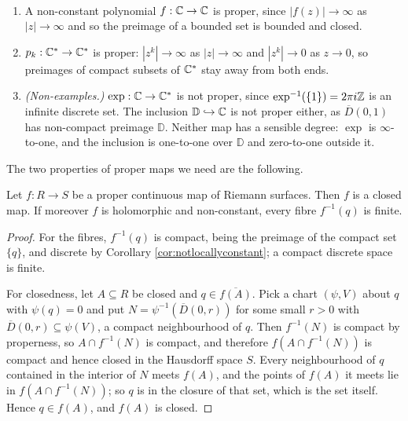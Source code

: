 \documentclass[a4paper]{scrartcl}
\newcommand{\disc}{\mathbb{D}}
\newcommand{\Cs}{\C^*}
\begin{document}
\begin{example}\
	\begin{enumerate}[label=(\roman*)]
		\item A non-constant polynomial $f : \mathbb{C} \to \mathbb{C}$ is proper, since $|f(z)|\to\infty$
		as $|z|\to\infty$ and so the preimage of a bounded set is bounded and closed.
		\item $p_k : \Cs \to \Cs$ is proper: $|z^k| \to \infty$ as $|z| \to \infty$ and
		$|z^k|\to 0$ as $z \to 0$, so preimages of compact subsets of $\Cs$ stay away from
		both ends.
		\item \emph{(Non-examples.)} $\exp : \C \to \Cs$ is not proper, since
		$\exp^{-1}(\{1\}) = 2\pi i \mathbb{Z}$ is an infinite discrete set. The inclusion
		$\disc \hookrightarrow \C$ is not proper either, as $\overline{D}(0,1)$ has
		non-compact preimage $\disc$. Neither map has a sensible degree: $\exp$ is
		$\infty$-to-one, and the inclusion is one-to-one over $\disc$ and zero-to-one
		outside it.
	\end{enumerate}
\end{example}

The two properties of proper maps we need are the following.

\begin{lemma}\label{lem:properclosed}
	Let $f : R \to S$ be a proper continuous map of Riemann surfaces. Then $f$ is a closed
	map. If moreover $f$ is holomorphic and non-constant, every fibre $f^{-1}(q)$ is finite.
\end{lemma}

\begin{proof}
	For the fibres, $f^{-1}(q)$ is compact, being the preimage of the compact set $\{q\}$,
	and discrete by Corollary \ref{cor:notlocallyconstant}; a compact discrete space is
	finite.

	For closedness, let $A \subseteq R$ be closed and $q \in \overline{f(A)}$. Pick a chart
	$(\psi, V)$ about $q$ with $\psi(q) = 0$ and put
	$N = \psi^{-1}(\overline{D}(0,r))$ for some small $r > 0$ with
	$\overline{D}(0,r)\subseteq\psi(V)$, a compact neighbourhood of $q$. Then $f^{-1}(N)$
	is compact by properness, so $A \cap f^{-1}(N)$ is compact, and therefore
	$f\left(A \cap f^{-1}(N)\right)$ is compact and hence closed in the Hausdorff space $S$.
	Every neighbourhood of $q$ contained in the interior of $N$ meets $f(A)$, and the points
	of $f(A)$ it meets lie in $f(A\cap f^{-1}(N))$; so $q$ is in the closure of that set,
	which is the set itself. Hence $q \in f(A)$, and $f(A)$ is closed.
\end{proof}
\end{document}
